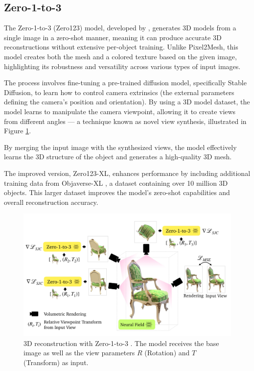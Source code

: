 \subsection{Zero-1-to-3} \label{section:zero123}
The Zero-1-to-3 (Zero123) model, developed by \textcite{liu_zero-1--3_2023}, generates 3D models from a single image in a zero-shot manner, meaning it can produce accurate 3D reconstructions without extensive per-object training. Unlike Pixel2Mesh, this model creates both the mesh and a colored texture based on the given image, highlighting its robustness and versatility across various types of input images.

The process involves fine-tuning a pre-trained diffusion model, specifically Stable Diffusion, to learn how to control camera extrinsics (the external parameters defining the camera's position and orientation).
By using a 3D model dataset, the model learns to manipulate the camera viewpoint, allowing it to create views from different angles — a technique known as novel view synthesis, illustrated in Figure \ref{fig:zero-1-to-3}.

By merging the input image with the synthesized views, the model effectively learns the 3D structure of the object and generates a high-quality 3D mesh.

The improved version, Zero123-XL, enhances performance by including additional training data from Objaverse-XL \autocite{deitke_objaverse-xl_2023}, a dataset containing over 10 million 3D objects.
This larger dataset improves the model's zero-shot capabilities and overall reconstruction accuracy.

\begin{figure}
    \centering
    \includegraphics[width=0.9\linewidth]{images/zero-1-to-3.jpg}
    \caption{3D reconstruction with Zero-1-to-3 \autocite{liu_zero-1--3_2023}. The model receives the base image as well as the view parameters \(R\) (Rotation) and \(T\) (Transform) as input.}
    \label{fig:zero-1-to-3}
\end{figure}

